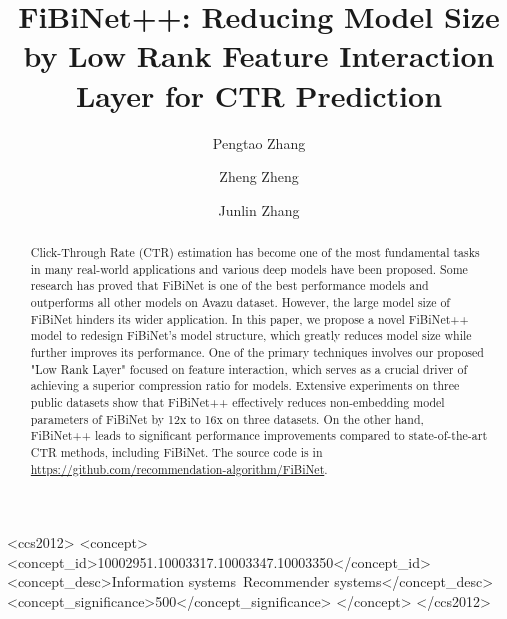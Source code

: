 \documentclass[sigconf]{acmart}
\begin{document}
\title{FiBiNet++: Reducing Model Size by Low Rank Feature Interaction Layer for CTR Prediction}

\author{Pengtao Zhang}

\author{Zheng Zheng}

\author{Junlin Zhang}


\renewcommand{\shortauthors}{Pengtao Zhang, Zheng Zheng, \& Junlin Zhang}

\begin{abstract}

Click-Through Rate (CTR) estimation has become one of the most fundamental tasks in many real-world applications and various deep models have been proposed. Some research has proved that FiBiNet is one of the best performance models and outperforms all other models on Avazu dataset. However, the large model size of FiBiNet hinders its wider application. In this paper, we propose a novel FiBiNet++ model to redesign FiBiNet's model structure, which greatly reduces model size while further improves its performance. One of the primary techniques involves our proposed "Low Rank Layer" focused on feature interaction, which serves as a crucial driver of achieving a superior compression ratio for models. Extensive experiments on three public datasets show that FiBiNet++  effectively reduces non-embedding model parameters of FiBiNet by 12x to 16x on three datasets. On the other hand, FiBiNet++ leads to significant performance improvements compared to state-of-the-art CTR methods, including FiBiNet. The source code is in \url{https://github.com/recommendation-algorithm/FiBiNet}.

\end{abstract}

\begin{CCSXML}
<ccs2012>
 <concept>
    <concept_id>10002951.10003317.10003347.10003350</concept_id>
    <concept_desc>Information systems~Recommender systems</concept_desc>
    <concept_significance>500</concept_significance>
 </concept>
</ccs2012>
\end{CCSXML}

\end{document}
